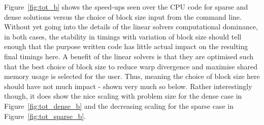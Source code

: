 Figure~\ref{fig:tot_b} shows the speed-ups seen over the CPU code for sparse and dense solutions versus the choice of block size input from the command line. Without yet going into the details of the linear solvers computational dominance, in both cases, the stability in timings with variation of block size should tell enough that the purpose written code has little actual impact on the resulting final timings here. A benefit of the linear solvers is that they are optimised such that the best choice of block size to reduce warp divergence and maximise shared memory usage is selected for the user. Thus, meaning the choice of block size here should have not much impact - shown very much so below. Rather interestingly though, it does show the nice scaling with problem size for the dense case in Figure~\ref{fig:tot_dense_b} and the decreasing scaling for the sparse case in Figure~\ref{fig:tot_sparse_b}.
